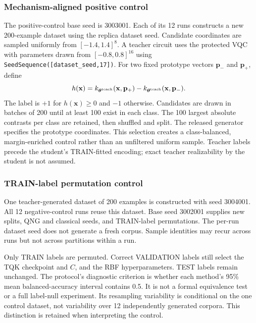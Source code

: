 \subsubsection{Mechanism-aligned positive control}
The positive-control base seed is 3003001. Each of its 12 runs constructs a new 200-example dataset using the replica dataset seed. Candidate coordinates are sampled uniformly from $[-1.4,1.4]^8$. A teacher circuit uses the protected VQC with parameters drawn from $[-0.8,0.8]^{16}$ using \texttt{SeedSequence([dataset\_seed,17])}. For two fixed prototype vectors $\mathbf p_-$ and $\mathbf p_+$, define
\begin{equation}
 h(\mathbf x)=k_{\boldsymbol\theta^{\rm teach}}(\mathbf x,\mathbf p_+)
              -k_{\boldsymbol\theta^{\rm teach}}(\mathbf x,\mathbf p_-).
 \label{eq:teacher-control}
\end{equation}
The label is $+1$ for $h(\mathbf x)\geq0$ and $-1$ otherwise. Candidates are drawn in batches of 200 until at least 100 exist in each class. The 100 largest absolute contrasts per class are retained, then shuffled and split. The released generator specifies the prototype coordinates. This selection creates a class-balanced, margin-enriched control rather than an unfiltered uniform sample. Teacher labels precede the student's TRAIN-fitted encoding; exact teacher realizability by the student is not assumed.

\subsubsection{TRAIN-label permutation control}
One teacher-generated dataset of 200 examples is constructed with seed 3004001. All 12 negative-control runs reuse this dataset. Base seed 3002001 supplies new splits, QNG and classical seeds, and TRAIN-label permutations. The per-run dataset seed does not generate a fresh corpus. Sample identities may recur across runs but not across partitions within a run.

Only TRAIN labels are permuted. Correct VALIDATION labels still select the TQK checkpoint and $C$, and the RBF hyperparameters. TEST labels remain unchanged. The protocol's diagnostic criterion is whether each method's 95\% mean balanced-accuracy interval contains 0.5. It is not a formal equivalence test or a full label-null experiment. Its resampling variability is conditional on the one control dataset, not variability over 12 independently generated corpora. This distinction is retained when interpreting the control.

